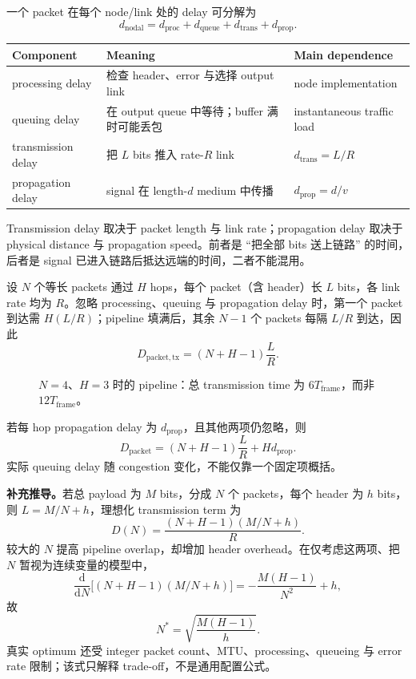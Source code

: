 一个 packet 在每个 node/link 处的 delay 可分解为
\[
  \boxed{d_{\mathrm{nodal}}
  =d_{\mathrm{proc}}+d_{\mathrm{queue}}
  +d_{\mathrm{trans}}+d_{\mathrm{prop}}}.
\]
\begin{center}
\small
\begin{tabularx}{\textwidth}{@{}>{\raggedright\arraybackslash}p{3.2cm}X>{\raggedright\arraybackslash}p{3.3cm}@{}}
  \toprule
  Component & Meaning & Main dependence \\
  \midrule
  processing delay & 检查 header、error 与选择 output link & node implementation \\
  queuing delay & 在 output queue 中等待；buffer 满时可能丢包 & instantaneous traffic load \\
  transmission delay & 把 $L$ bits 推入 rate-$R$ link & $d_{\mathrm{trans}}=L/R$ \\
  propagation delay & signal 在 length-$d$ medium 中传播 & $d_{\mathrm{prop}}=d/v$ \\
  \bottomrule
\end{tabularx}
\end{center}

Transmission delay 取决于 packet length 与 link rate；propagation delay 取决于 physical distance 与 propagation speed。前者是 ``把全部 bits 送上链路'' 的时间，后者是 signal 已进入链路后抵达远端的时间，二者不能混用。


设 $N$ 个等长 packets 通过 $H$ hops，每个 packet（含 header）长 $L$ bits，各 link rate 均为 $R$。忽略 processing、queuing 与 propagation delay 时，第一个 packet 到达需 $H(L/R)$；pipeline 填满后，其余 $N-1$ 个 packets 每隔 $L/R$ 到达，因此
\[
  \boxed{D_{\mathrm{packet,tx}}=(N+H-1)\frac{L}{R}}.
\]

\begin{figure}[htbp]
  \centering
  \resizebox{0.73\textwidth}{!}{}
  \caption{$N=4$、$H=3$ 时的 pipeline：总 transmission time 为 $6T_{\mathrm{frame}}$，而非 $12T_{\mathrm{frame}}$。}
  \label{fig:sc2008-l05-pipeline}
\end{figure}

若每 hop propagation delay 为 $d_{\mathrm{prop}}$，且其他两项仍忽略，则
\[
  D_{\mathrm{packet}}=(N+H-1)\frac{L}{R}+H d_{\mathrm{prop}}.
\]
实际 queuing delay 随 congestion 变化，不能仅靠一个固定项概括。

\textbf{补充推导。}若总 payload 为 $M$ bits，分成 $N$ 个 packets，每个 header 为 $h$ bits，则 $L=M/N+h$，理想化 transmission term 为
\[
  D(N)=\frac{(N+H-1)(M/N+h)}{R}.
\]
较大的 $N$ 提高 pipeline overlap，却增加 header overhead。在仅考虑这两项、把 $N$ 暂视为连续变量的模型中，
\[
  \frac{\mathrm d}{\mathrm dN}\bigl[(N+H-1)(M/N+h)\bigr]
  =-\frac{M(H-1)}{N^2}+h,
\]
故
\[
  \boxed{N^*=\sqrt{\frac{M(H-1)}{h}}}.
\]
真实 optimum 还受 integer packet count、MTU、processing、queueing 与 error rate 限制；该式只解释 trade-off，不是通用配置公式。

